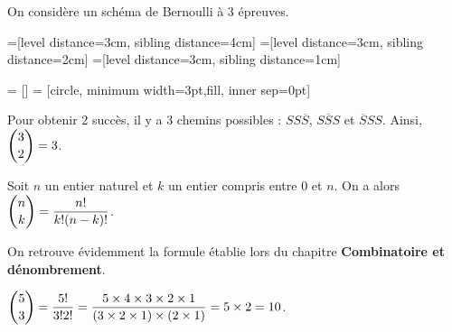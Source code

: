 \documentclass[11pt,fleqn, openany]{book} %
\begin{document}
\begin{example} On considère un schéma de Bernoulli à 3 épreuves.

=[level distance=3cm, sibling distance=4cm]
=[level distance=3cm, sibling distance=2cm]
=[level distance=3cm, sibling distance=1cm]

 = []
 = [circle, minimum width=3pt,fill, inner sep=0pt]

\begin{center}
\end{center}

Pour obtenir 2 succès, il y a 3 chemins possibles : $SS\overline{S}$, $S\overline{S}S$ et $\overline{S}SS$. Ainsi, $\dbinom{3}{2} = 3$.

\end{example}

\begin{proposition}Soit $n$ un entier naturel et $k$ un entier compris entre 0 et $n$. On a alors $\dbinom{n}{k} = \dfrac{n!}{k!(n-k)!}$.\end{proposition}

On retrouve évidemment la formule établie lors du chapitre \textbf{Combinatoire et dénombrement}.

\begin{example} $\dbinom{5}{3} = \dfrac{5!}{3!2!}= \dfrac{5 \times 4 \times 3 \times 2 \times 1}{(3 \times 2 \times 1) \times (2 \times 1)} = 5 \times 2 = 10$.\end{example}
\end{document}
